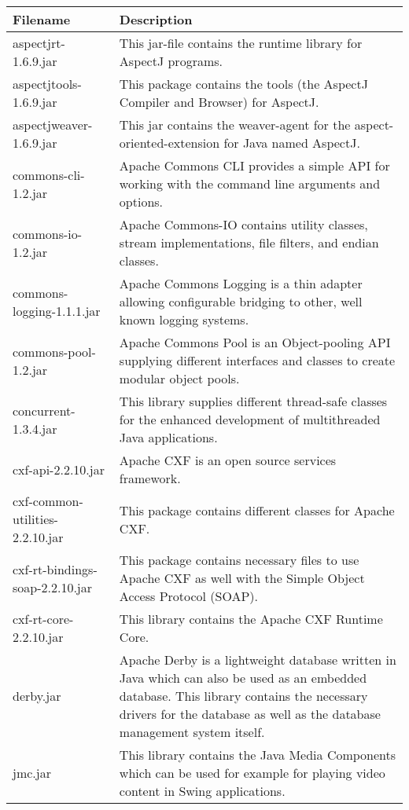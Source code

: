 \begin{center}
\begin{longtable}{|p{}|p{}|}
\hline 
Filename & Description\\
\hline
\hline 
aspectjrt-1.6.9.jar & This jar-file contains the runtime library for AspectJ programs.\\
\hline 
aspectjtools-1.6.9.jar & This package contains the tools (the AspectJ Compiler and Browser) for AspectJ.\\
\hline 
aspectjweaver-1.6.9.jar & This jar contains the weaver-agent for the aspect-oriented-extension for Java named AspectJ.\\
\hline 
commons-cli-1.2.jar & Apache Commons CLI provides a simple API for working with the command line arguments and options.\\
\hline 
commons-io-1.2.jar & Apache Commons-IO contains utility classes, stream implementations, file filters, and endian classes.\\
\hline 
commons-logging-1.1.1.jar & Apache Commons Logging is a thin adapter allowing configurable bridging to other, well known logging systems.\\
\hline 
commons-pool-1.2.jar & Apache Commons Pool is an Object-pooling API supplying different interfaces and classes to create modular object pools.\\
\hline 
concurrent-1.3.4.jar & This library supplies different thread-safe classes for the enhanced development of multithreaded Java applications.\\
\hline 
cxf-api-2.2.10.jar & Apache CXF is an open source services framework.  \\
\hline 
cxf-common-utilities-2.2.10.jar & This package contains different classes for Apache CXF.\\
\hline 
cxf-rt-bindings-soap-2.2.10.jar & This package contains necessary files to use Apache CXF as well with the Simple Object Access Protocol (SOAP).\\
\hline 
cxf-rt-core-2.2.10.jar & This library contains the Apache CXF Runtime Core. \\
\hline 
derby.jar & Apache Derby is a lightweight database written in Java which can also be used as an embedded database. This library contains the necessary drivers for the database as well as the database management system itself.\\
\hline 
jmc.jar & This library contains the Java Media Components which can be used for example for playing video content in Swing applications.\\

\end{longtable}
\end{center}

